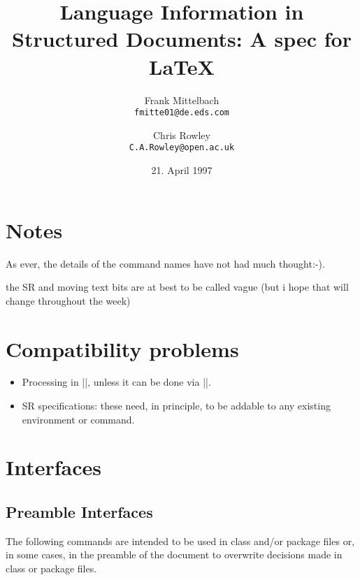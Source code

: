 \documentclass{ltxguide}
\begin{document}
\title{Language Information in 
       Structured Documents: 
       A spec for \LaTeX{}
}

\author{Frank Mittelbach \\ \texttt{fmitte01@de.eds.com} 
   \and Chris Rowley \\ \texttt{C.A.Rowley@open.ac.uk}}

\date{21. April 1997}

\maketitle

\tableofcontents



\section{Notes}

As ever, the details of the command names have not had much
thought:-).

the SR and moving text bits are at best to be called vague (but i hope
that will change throughout the week)



\section{Compatibility problems}

\begin{itemize}

\item Processing in |\document|, unless it can be done via |\AtBeginDocument|.

\item SR specifications: these need, in principle, to be addable to any
  existing environment or command.
\end{itemize}



\section{Interfaces}


\subsection{Preamble Interfaces}

The following commands are intended to be used in class and/or package
files or, in some cases, in the preamble of the document to overwrite
decisions made in class or package files.
\end{document}
